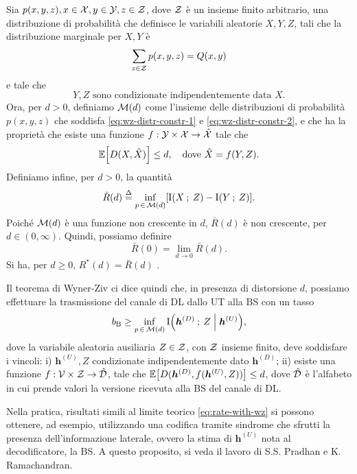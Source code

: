 \begin{thm}
    Sia \(p(x,y,z), x \in \mathcal{X}, y \in \mathcal{Y}, z \in \mathcal{Z}\), dove
    \(\mathcal{Z}\) è un insieme finito arbitrario, una distribuzione di
    probabilità che definisce le variabili aleatorie \(X,Y,Z\), tali che la
    distribuzione marginale per \(X,Y\) è
    \begin{equation}
        \sum_{z \in \mathcal{Z}} p(x,y,z) = Q(x,y) \label{eq:wz-distr-constr-1}
    \end{equation}
    e tale che
    \begin{equation}
        Y,Z \textrm{ sono condizionate indipendentemente data } X.
        \label{eq:wz-distr-constr-2}
    \end{equation}
    Ora, per \(d > 0\), definiamo \(\mathcal{M}(d)\) come l'insieme delle
    distribuzioni di probabilità \(p(x,y,z)\) che soddisfa
    \eqref{eq:wz-distr-constr-1} e \eqref{eq:wz-distr-constr-2}, e che ha la
    proprietà che esiste una funzione \(f: \mathcal{Y}\times\mathcal{X} \to
    \hat{\mathcal{X}}\) tale che
    \begin{equation}
        \expect{D(X,\hat{X})} \le d, \quad
        \textrm{dove } \hat{X} = f(Y,Z) .
    \end{equation}
    Definiamo infine, per \(d > 0\), la quantità
    \begin{equation}
        \bar{R}(d) \define \inf_{p\,\in\,\set{M}(d)} \mleft[
            \mutual{X}{Z} - \mutual{Y}{Z}
            \mright] .
    \end{equation}
    Poiché \(\mathcal{M}(d)\) è una funzione non crescente in \(d\), \(\bar{R}(d)\)
    è non crescente, per \(d \in (0,\infty)\). Quindi, possiamo definire
    \begin{equation}
        \bar{R}(0) = \lim_{d\to0} \bar{R}(d) .
    \end{equation}
    Si ha, per \(d \ge 0\), \(R^{*}(d) = \bar{R}(d)\) .
\end{thm}

Il teorema di Wyner-Ziv ci dice quindi che, in presenza di distorsione \(d\),
possiamo effettuare la trasmissione del canale di DL dallo UT alla BS con un
tasso
\begin{equation}
    b_\mathrm{B} \ge \inf_{p\,\in\,\set{M}(d)}
    \mutual{\bm{h}^{(D)}}{Z \given \bm{h}^{(U)}} , \label{eq:rate-with-wz}
\end{equation}
dove la variabile aleatoria ausiliaria \(Z \in \mathcal{Z}\), con \(\mathcal{Z}\)
insieme finito, deve soddisfare i vincoli: i) \(\bm{h}^{(U)},Z\) condizionate
indipendentemente dato \(\bm{h}^{(D)}\); ii) esiste una funzione \(f:
\mathcal{V}\times\mathcal{Z} \to \hat{\mathcal{D}}\), tale che
\(\expect{D(\bm{h}^{(D)},f(\bm{h}^{(U)},Z))} \le d\), dove \(\hat{\mathcal{D}}\) è
l'alfabeto in cui prende valori la versione ricevuta alla BS del canale di DL.

Nella pratica, risultati simili al limite teorico \eqref{eq:rate-with-wz} si
possono ottenere, ad esempio, utilizzando una codifica tramite sindrome che
sfrutti la presenza dell'informazione laterale, ovvero la stima di
\(\bm{h}^{(U)}\) nota al decodificatore, la BS. A questo proposito, si veda il
lavoro di S.S. Pradhan e K. Ramachandran.\cite{1184140}
